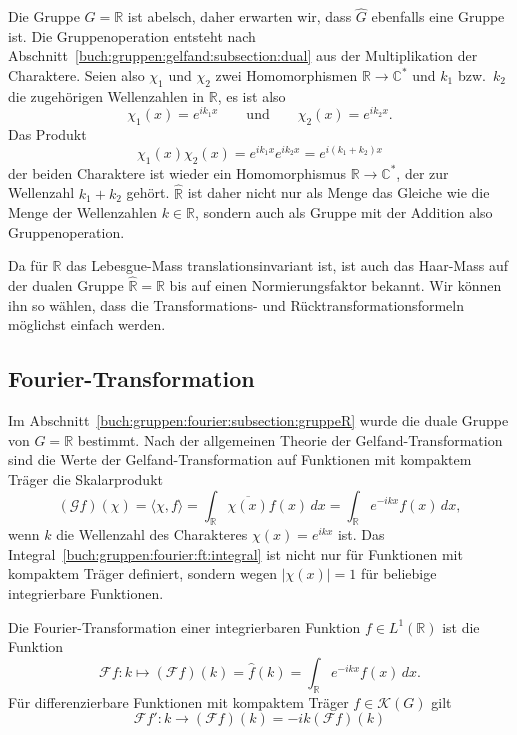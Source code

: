 Die Gruppe $G=\mathbb{R}$ ist abelsch, daher erwarten wir, dass 
$\hat{G}$ ebenfalls eine Gruppe ist.
Die Gruppenoperation entsteht nach
Abschnitt~\ref{buch:gruppen:gelfand:subsection:dual} aus der 
Multiplikation der Charaktere.
Seien also $\chi_1$ und $\chi_2$ zwei Homomorphismen
$\mathbb{R}\to\mathbb{C}^*$ und $k_1$ bzw.~$k_2$ die zugehörigen
Wellenzahlen in $\mathbb{R}$, es ist also
\[
\chi_1(x) = e^{ik_1x}
\qquad\text{und}\qquad
\chi_2(x) = e^{ik_2x}.
\]
Das Produkt
\[
\chi_1(x)\chi_2(x)
=
e^{ik_1x}e^{ik_2x}
=
e^{i(k_1+k_2)x}
\]
der beiden Charaktere ist wieder ein Homomorphismus
$\mathbb{R}\to\mathbb{C}^*$, der zur Wellenzahl $k_1+k_2$ gehört.
$\hat{\mathbb{R}}$ ist daher nicht nur als Menge das Gleiche wie
die Menge der Wellenzahlen $k\in \mathbb{R}$, sondern auch als
Gruppe mit der Addition also Gruppenoperation.

Da für $\mathbb{R}$ das Lebesgue-Mass translationsinvariant ist,
ist auch das Haar-Mass auf der dualen Gruppe $\hat{\mathbb{R}}=\mathbb{R}$
bis auf einen Normierungsfaktor bekannt.
Wir können ihn so wählen, dass die Transformations- und
Rücktransformationsformeln möglichst einfach werden.

%
%
\subsection{Fourier-Transformation
\label{buch:gruppen:fourier:subsection:transformation}}
Im Abschnitt~\ref{buch:gruppen:fourier:subsection:gruppeR}
wurde die duale Gruppe von $G=\mathbb{R}$ bestimmt.
Nach der allgemeinen Theorie der Gelfand-Transformation sind die
Werte der Gelfand-Transformation auf Funktionen mit kompaktem
Träger die Skalarprodukt
\begin{equation}
(\mathscr{G}f)(\chi)
=
\langle \chi,f\rangle
=
\int_{\mathbb{R}} \overline{\chi(x)} f(x)\,dx
=
\int_{\mathbb{R}} e^{-ikx} f(x)\,dx,
\label{buch:gruppen:fourier:ft:integral}
\end{equation}
wenn $k$ die Wellenzahl des Charakteres $\chi(x)=e^{ikx}$ ist.
Das Integral~\eqref{buch:gruppen:fourier:ft:integral} ist nicht nur
für Funktionen mit kompaktem Träger definiert, sondern wegen $|\chi(x)|=1$
für beliebige integrierbare Funktionen.

\begin{definition}
\label{buch:gruppen:fourier:def:ft}
Die Fourier-Transformation einer integrierbaren Funktion $f\in L^1(\mathbb{R})$
%
ist die Funktion
\[
\mathscr{F}f
\colon
k\mapsto
(\mathscr{F}f)(k)
=
\hat{f}(k)
=
\int_{\mathbb{R}} e^{-ikx}f(x)\,dx.
\]
Für differenzierbare Funktionen mit kompaktem Träger $f\in\mathscr{K}(G)$ 
gilt
\begin{equation}
\mathscr{F}f'
\colon k\to (\mathscr{F}f)(k)
=
-ik(\mathscr{F}f) (k)
\label{buch:gruppen:fourier:eqn:ableitung}
\end{equation}
\end{definition}

